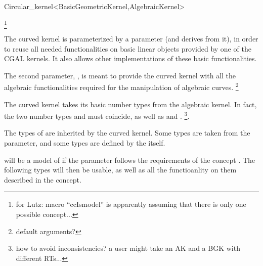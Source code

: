 \begin{ccRefClass}{Circular_kernel<BasicGeometricKernel,AlgebraicKernel>}

\ccDefinition


\footnote{for Lutz: macro ``ccIsmodel'' is
apparently assuming that there is only one possible concept...}

\ccParameters

The curved kernel is parameterized by a  parameter
(and derives from it), in order to reuse all needed functionalities on
basic linear objects provided by one of the CGAL kernels. It also
allows other implementations of these basic functionalities.

The second parameter, , is meant to provide the
curved kernel with all the algebraic functionalities required for the
manipulation of algebraic curves. 
\footnote{default arguments?}

\ccInheritsFrom


\ccTypes

\ccThreeToTwo

The curved kernel takes its basic number types from the algebraic kernel. 
In fact, the two number types  and
 must coincide, as well as
 and .
\footnote{how to avoid inconsistencies? a user might take an AK and a
BGK with different RTs...}. 

The types of  are inherited by the curved kernel.
Some types are taken from the  parameter, and
some types are defined by the  itself.

 will be a model of  if the 
 parameter follows the requirements of the 
concept . The following types will then be
usable, as well as all the functioanlity on them described in the
 concept. 

\ccGlue
{} 
\ccGlue
{}
\ccGlue
{}


\end{ccRefClass}
